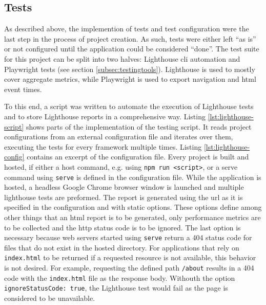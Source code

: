 \documentclass[a4paper, 10pt]{article}
\begin{document}
\subsection{Tests}\label{subsec:tests}
% 

As described above, the implemention of tests and test configuration were the last step in the process of project creation.
As such, tests were either left \enquote{as is} or not configured until the application could be considered \enquote{done}.
The test suite for this project can be split into two halves: Lighthouse \acrshort{cli} automation and Playwright tests (see section \ref{subsec:testingtools}).
Lighthouse is used to mostly cover aggregate metrics, while Playwright is used to export navigation and \acrshort{html} event times.

To this end, a script was written to automate the execution of Lighthouse tests and to store Lighthouse reports in a comprehensive way.
Listing \ref{lst:lighthouse-script} shows parts of the implementation of the testing script.
It reads project configurations from an external configuration file and iterates over them, executing the tests for every framework multiple times.
Listing \ref{lst:lighthouse-config} contains an excerpt of the configuration file.
Every project is built and hosted, if either a host command, e.g. using \verb|npm run <script>|, or a serve command using \verb|serve| is defined in the configuration file.
While the application is hosted, a headless Google Chrome browser window is launched and multiple lighthouse tests are preformed.
The report is generated using the \acrshort{url} as it is specified in the configuration and with static options.
These options define among other things that an \acrshort{html} report is to be generated, only performance metrics are to be collected and the \acrshort{http} status code is to be ignored.
The last option is necessary because web servers started using \verb|serve| return a 404 status code for files that do not exist in the hosted directory.
For applications that rely on \verb|index.html| to be returned if a requested resource is not available, this behavior is not desired.
For example, requesting the defined path \verb|/about| results in a 404 code with the \verb|index.html| file as the response body.
Withouth the option \verb|ignoreStatusCode: true|, the Lighthouse test would fail as the page is considered to be unavailable.
\end{document}
